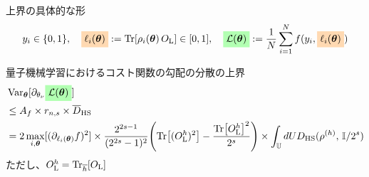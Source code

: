 \documentclass[dvipdfmx,10pt,aspectratio=169]{beamer}
\begin{document}
\begin{frame}{上界の具体的な形}
    $$
        y_i \in \{0,1\},\quad \colorbox{orange!30}{$\ell_i(\bth)$} := \Tr[\rho_i(\bth)\,O_\rmL] \in [0,1],\quad
        \colorbox{green!30}{$\calL(\bth)$} := \frac1N\sum_{i=1}^N f(y_i, \colorbox{orange!30}{$\ell_i(\bth)$})
    $$
    \begin{theorem}
        量子機械学習におけるコスト関数の勾配の分散の上界
        \begin{align*}
            &\Var_{\bth}[\pd_{\theta_\nu} \colorbox{green!30}{$\calL(\bth)$}]\\
            &\leq A_f \times r_{n,s} \times \bar{D}_{\mathrm{HS}}\\
            &=
            2\max_{i,\bth} [(\pd_{\ell_i(\bth)}f)^2]
            \times \frac{2^{2s-1}}{(2^{2s}-1)^2}\qty(\Tr[(O_\rmL^h)^2] - \frac{\Tr[O_\rmL^h]^2}{2^s})
            \times \int_{\bbU}dU D_{\mathrm{HS}} ( \rho^{(h)},\, \bbI/2^s )
        \end{align*}
        ただし、$O_{\mathrm{L}}^h = \Tr_{\overline{h}}[O_{\mathrm{L}}]$
    \end{theorem}
\end{frame}
\end{document}
